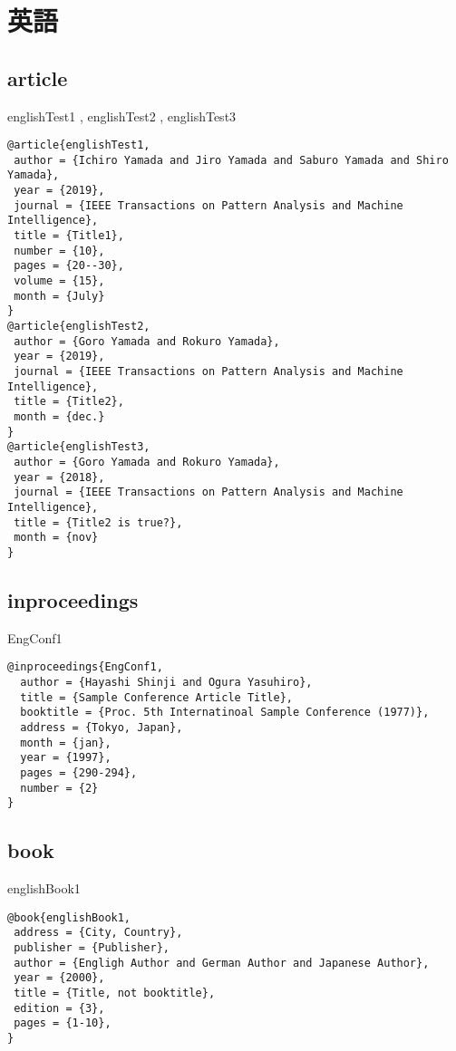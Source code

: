\documentclass[10pt,a4paper]{article}
\begin{document}
\section{英語}
\subsection{article}

englishTest1 \cite{englishTest1},
englishTest2 \cite{englishTest2},
englishTest3 \cite{englishTest3}

\begin{lstlisting}
@article{englishTest1,
 author = {Ichiro Yamada and Jiro Yamada and Saburo Yamada and Shiro Yamada},
 year = {2019},
 journal = {IEEE Transactions on Pattern Analysis and Machine Intelligence},
 title = {Title1},
 number = {10},
 pages = {20--30},
 volume = {15},
 month = {July}
}
@article{englishTest2,
 author = {Goro Yamada and Rokuro Yamada},
 year = {2019},
 journal = {IEEE Transactions on Pattern Analysis and Machine Intelligence},
 title = {Title2},
 month = {dec.}
}
@article{englishTest3,
 author = {Goro Yamada and Rokuro Yamada},
 year = {2018},
 journal = {IEEE Transactions on Pattern Analysis and Machine Intelligence},
 title = {Title2 is true?},
 month = {nov}
}
\end{lstlisting}

\subsection{inproceedings}
EngConf1 \cite{EngConf1}
\begin{lstlisting}
@inproceedings{EngConf1,
  author = {Hayashi Shinji and Ogura Yasuhiro},
  title = {Sample Conference Article Title},
  booktitle = {Proc. 5th Internatinoal Sample Conference (1977)},
  address = {Tokyo, Japan},
  month = {jan},
  year = {1997},
  pages = {290-294},
  number = {2}
}
\end{lstlisting}

\subsection{book}
englishBook1 \cite{englishBook1}

\begin{lstlisting}
@book{englishBook1,
 address = {City, Country},
 publisher = {Publisher},
 author = {Engligh Author and German Author and Japanese Author},
 year = {2000},
 title = {Title, not booktitle},
 edition = {3},
 pages = {1-10},
}
\end{lstlisting}
\end{document}
